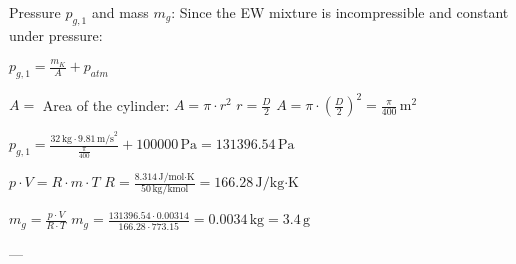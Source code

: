 Pressure \( p_{g,1} \) and mass \( m_g \):  
Since the EW mixture is incompressible and constant under pressure:  

\( p_{g,1} = \frac{m_K}{A} + p_{atm} \)  

\( A = \) Area of the cylinder:  
\( A = \pi \cdot r^2 \)  
\( r = \frac{D}{2} \)  
\( A = \pi \cdot \left(\frac{D}{2}\right)^2 = \frac{\pi}{400} \, \text{m}^2 \)  

\( p_{g,1} = \frac{32 \, \text{kg} \cdot 9.81 \, \text{m/s}^2}{\frac{\pi}{400}} + 100000 \, \text{Pa} = 131396.54 \, \text{Pa} \)  

\( p \cdot V = R \cdot m \cdot T \)  
\( R = \frac{8.314 \, \text{J/mol·K}}{50 \, \text{kg/kmol}} = 166.28 \, \text{J/kg·K} \)  

\( m_g = \frac{p \cdot V}{R \cdot T} \)  
\( m_g = \frac{131396.54 \cdot 0.00314}{166.28 \cdot 773.15} = 0.0034 \, \text{kg} = 3.4 \, \text{g} \)  

---